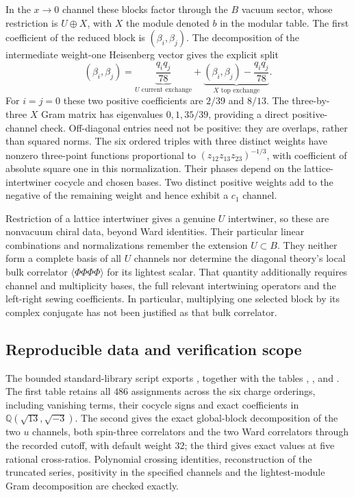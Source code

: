 In the $x\to0$ channel these blocks factor through the $B$ vacuum
sector, whose restriction is $U\oplus X$, with $X$ the module denoted
$b$ in the modular table.  The first coefficient of the reduced block
is $(\beta_i,\beta_j)$.  The decomposition of the intermediate
weight-one Heisenberg vector gives the explicit split
\begin{equation}
 (\beta_i,\beta_j)
 =\underbrace{\frac{q_iq_j}{78}}_{U\text{ current exchange}}
 +\underbrace{\left(\beta_i,\beta_j\right)
                    -\frac{q_iq_j}{78}}_{X\text{ top exchange}}.
\end{equation}
For $i=j=0$ these two positive coefficients are $2/39$ and $8/13$.
The three-by-three $X$ Gram matrix has eigenvalues $0,1,35/39$,
providing a direct positive-channel check.  Off-diagonal entries need
not be positive: they are overlaps, rather than squared norms.
The six ordered triples with three distinct weights have nonzero
three-point functions proportional to
$(z_{12}z_{13}z_{23})^{-1/3}$, with coefficient of absolute square one
in this normalization.  Their phases depend on the lattice-intertwiner
cocycle and chosen bases.  Two distinct positive weights add to the
negative of the remaining weight and hence exhibit a $c_1$ channel.

Restriction of a lattice intertwiner gives a genuine $U$ intertwiner,
so these are nonvacuum chiral data, beyond Ward identities.  Their
particular linear combinations and normalizations remember the
extension $U\subset B$.  They neither form a complete basis of all
$U$ channels nor determine the diagonal theory's local bulk correlator
$\langle\Phi\Phi\Phi\Phi\rangle$ for its lightest scalar.
That quantity additionally requires channel and multiplicity bases,
the full relevant intertwining operators and the left-right sewing
coefficients.  In particular, multiplying one selected block by its
complex conjugate has not been justified as that bulk correlator.

\subsection{Reproducible data and verification scope}

The bounded standard-library script
 exports
, together with the
tables ,
, and
.
The first table retains all $486$ assignments across the six charge
orderings, including vanishing terms, their cocycle signs and exact
coefficients in $\mathbb Q(\sqrt{13},\sqrt{-3})$.
The second gives the exact global-block decomposition of the two
$u$ channels, both spin-three correlators and the two Ward correlators through the recorded
cutoff, with default weight $32$; the third gives exact values at five
rational cross-ratios.  Polynomial crossing identities, reconstruction
of the truncated series, positivity in the specified channels and the
lightest-module Gram decomposition are checked exactly.

